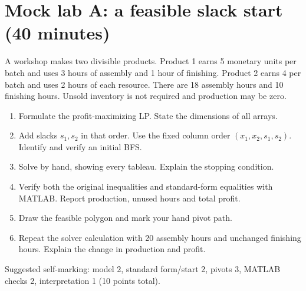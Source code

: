 \documentclass[11pt,a4paper]{article}
\begin{document}
\section{Mock lab A: a feasible slack start (40 minutes)}
A workshop makes two divisible products. Product 1 earns 5 monetary units per
batch and uses 3 hours of assembly and 1 hour of finishing. Product 2 earns
4 per batch and uses 2 hours of each resource. There are 18 assembly hours and
10 finishing hours. Unsold inventory is not required and production may be zero.
\begin{enumerate}[leftmargin=*]
  \item Formulate the profit-maximizing LP. State the dimensions of all arrays.
  \item Add slacks $s_1,s_2$ in that order. Use the fixed column order
        $(x_1,x_2,s_1,s_2)$. Identify and verify an initial BFS.
  \item Solve by hand, showing every tableau. Explain the stopping condition.
  \item Verify both the original inequalities and standard-form equalities
        with MATLAB. Report production, unused hours and total profit.
  \item Draw the feasible polygon and mark your hand pivot path.
  \item Repeat the solver calculation with 20 assembly hours and unchanged
        finishing hours. Explain the change in production and profit.
\end{enumerate}
Suggested self-marking: model 2, standard form/start 2, pivots 3,
MATLAB checks 2, interpretation 1 (10 points total).

\clearpage
\end{document}
